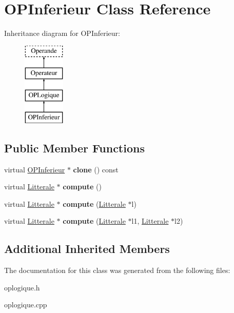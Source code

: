 \hypertarget{class_o_p_inferieur}{}\section{O\+P\+Inferieur Class Reference}
\label{class_o_p_inferieur}
Inheritance diagram for O\+P\+Inferieur\+:\begin{figure}[H]
\begin{center}
\leavevmode
\includegraphics[height=4.000000cm]{class_o_p_inferieur}
\end{center}
\end{figure}
\subsection*{Public Member Functions}
\begin{DoxyCompactItemize}
\item 
virtual \hyperlink{class_o_p_inferieur}{O\+P\+Inferieur} $\ast$ {\bfseries clone} () const \hypertarget{class_o_p_inferieur_a953a344135f81c92cd4d6895ebf74f1e}{}\label{class_o_p_inferieur_a953a344135f81c92cd4d6895ebf74f1e}

\item 
virtual \hyperlink{class_litterale}{Litterale} $\ast$ {\bfseries compute} ()\hypertarget{class_o_p_inferieur_a826fc72202c572a0860f143ebecb841c}{}\label{class_o_p_inferieur_a826fc72202c572a0860f143ebecb841c}

\item 
virtual \hyperlink{class_litterale}{Litterale} $\ast$ {\bfseries compute} (\hyperlink{class_litterale}{Litterale} $\ast$l)\hypertarget{class_o_p_inferieur_a1efec2ac3cfd59e28af99b37017bfef2}{}\label{class_o_p_inferieur_a1efec2ac3cfd59e28af99b37017bfef2}

\item 
virtual \hyperlink{class_litterale}{Litterale} $\ast$ {\bfseries compute} (\hyperlink{class_litterale}{Litterale} $\ast$l1, \hyperlink{class_litterale}{Litterale} $\ast$l2)\hypertarget{class_o_p_inferieur_a14b11dc8649984659b2b7ec1bd9d7aa8}{}\label{class_o_p_inferieur_a14b11dc8649984659b2b7ec1bd9d7aa8}

\end{DoxyCompactItemize}
\subsection*{Additional Inherited Members}


The documentation for this class was generated from the following files\+:\begin{DoxyCompactItemize}
\item 
oplogique.\+h\item 
oplogique.\+cpp\end{DoxyCompactItemize}
